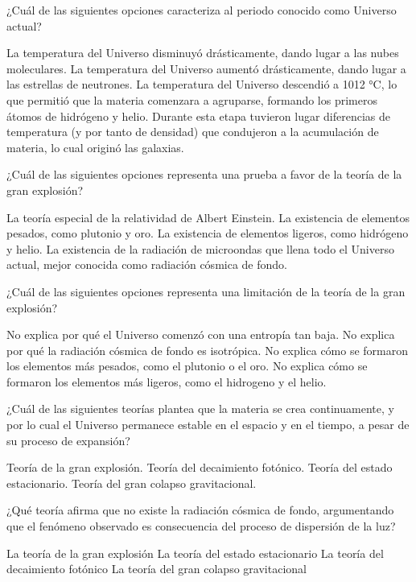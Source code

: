 \begin{parts}
    ¿Cuál de las siguientes opciones caracteriza al periodo conocido como Universo actual?

    \begin{choices}
        \choice La temperatura del Universo disminuyó drásticamente, dando lugar a las nubes moleculares.
        \choice La temperatura del Universo aumentó drásticamente, dando lugar a las estrellas de neutrones.
        \choice La temperatura del Universo descendió a 1012 °C, lo que permitió que la materia comenzara a agruparse, formando los primeros átomos de hidrógeno y helio.
        \CorrectChoice Durante esta etapa tuvieron lugar diferencias de temperatura (y por tanto de densidad) que condujeron a la acumulación de materia, lo cual originó las galaxias.
    \end{choices}

    \newpage
    ¿Cuál de las siguientes opciones representa una prueba a favor de la teoría de la gran explosión?
    \begin{choices}
        \choice La teoría especial de la relatividad de Albert Einstein.
        \choice La existencia de elementos pesados, como plutonio y oro.
        \choice La existencia de elementos ligeros, como hidrógeno y helio.
        \CorrectChoice La existencia de la radiación de microondas que llena todo el Universo actual, mejor conocida como radiación cósmica de fondo.
    \end{choices}

    ¿Cuál de las siguientes opciones representa una limitación de la teoría de la gran explosión?
    \begin{choices}
        \CorrectChoice No explica por qué el Universo comenzó con una entropía tan baja.
        \choice No explica por qué la radiación cósmica de fondo es isotrópica.
        \choice No explica cómo se formaron los elementos más pesados, como el plutonio o el oro.
        \choice No explica cómo se formaron los elementos más ligeros, como el hidrogeno y el helio.
    \end{choices}
    ¿Cuál de las siguientes teorías plantea que la materia se crea continuamente, y por lo cual el Universo permanece estable en el espacio y en el tiempo, a pesar de su proceso de expansión?
    \begin{choices}
        \choice Teoría de la gran explosión.
        \choice Teoría del decaimiento fotónico.
        \CorrectChoice Teoría del estado estacionario.
        \choice Teoría del gran colapso gravitacional.
    \end{choices}
    ¿Qué teoría afirma que no existe la radiación cósmica de fondo, argumentando que el fenómeno observado es consecuencia del proceso de dispersión de la luz?
    \begin{choices}
        \choice La teoría de la gran explosión
        \CorrectChoice La teoría del estado estacionario
        \choice La teoría del decaimiento fotónico
        \choice La teoría del gran colapso gravitacional
    \end{choices}


\end{parts}
